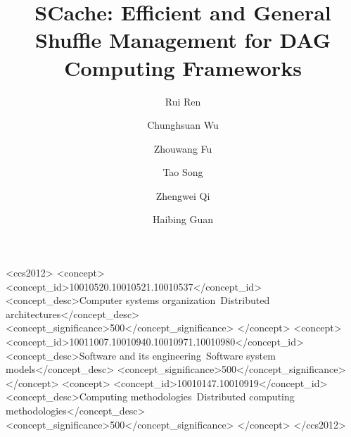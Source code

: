 \documentclass[format=acmsmall, review=false, screen=true]{acmart}
\begin{document}
\title[SCache: Efficient and General Shuffle Management for DAG Computing Frameworks]
{SCache: Efficient and General Shuffle Management for DAG Computing Frameworks}

\author{Rui Ren}
\author{Chunghsuan Wu}
\author{Zhouwang Fu}
\author{Tao Song}
\author{Zhengwei Qi}
\author{Haibing Guan}




%
%
\begin{CCSXML}
  <ccs2012>
  <concept>
  <concept_id>10010520.10010521.10010537</concept_id>
  <concept_desc>Computer systems organization~Distributed architectures</concept_desc>
  <concept_significance>500</concept_significance>
  </concept>
  <concept>
  <concept_id>10011007.10010940.10010971.10010980</concept_id>
  <concept_desc>Software and its engineering~Software system models</concept_desc>
  <concept_significance>500</concept_significance>
  </concept>
  <concept>
  <concept_id>10010147.10010919</concept_id>
  <concept_desc>Computing methodologies~Distributed computing methodologies</concept_desc>
  <concept_significance>500</concept_significance>
  </concept>
  </ccs2012>
\end{CCSXML}


%
%






\maketitle

\renewcommand{\shortauthors}{R. Rui et al.}













\end{document}
